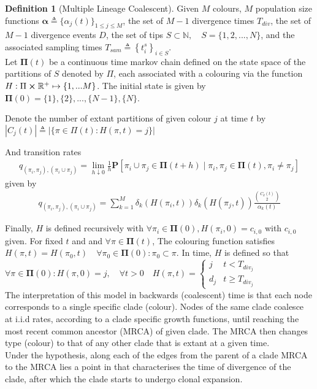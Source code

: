 \documentclass{report}
\newcommand{\R}{\mathbb{R}}
\newcommand{\N}{\mathbb{N}}
\theoremstyle{definition}
\newtheorem{definition}{Definition}[section]
\begin{document}
\begin{definition}[Multiple Lineage Coalescent]\label{def:model}
Given $M$ colours, $M$ population size functions $\mathbf{\alpha}\triangleq\{\alpha_j(t)\}_{1\leq j\leq M}$, the set of $M-1$ divergence times $T_{div}$, the set of $M-1$ divergence events $D$, the set of tips $S\subset \N, \quad S=\{1,2,...,N\}$, and the associated sampling times $T_{sam}\triangleq \left\{t^s_i\right\}_{i \in S}$.\\
Let $\pmb\Pi(t)$ be a continuous time markov chain defined on the state space of the partitions of $S$ denoted by $\Pi$, each associated with a colouring via the function $H: \Pi\cross\R^+ \mapsto \{1,...M\}$. The initial state is given by $\pmb\Pi(0) = \{1\}, \{2\}, ... , \{N-1\}, \{N\}$.

Denote the number of extant partitions of given colour $j$ at time $t$ by $|C_j(t)| \triangleq |\{\pi \in \Pi(t) : H(\pi, t) = j \}|$

And transition rates
\begin{gather}\label{eq:transitions}
q_{(\pi_i,\pi_j), (\pi_i\cup\pi_j)}=\lim\limits_{h \downarrow 0}\frac{1}{h}\mathbf{P}\left[\pi_i \cup \pi_j \in \pmb\Pi(t+h)\mid \pi_i, \pi_j \in \pmb\Pi(t), \pi_i \neq \pi_j \right]  
\end{gather}
given by
\begin{gather}\label{eq:rates}
q_{(\pi_i,\pi_j), (\pi_i\cup\pi_j)} = \sum\limits_{k=1}^{M} \delta_k(H(\pi_i,t))\delta_k(H(\pi_j,t))\frac{\binom{C_k(t)}{2}}{\alpha_k(t)}
\end{gather}
\end{definition}
Finally, $H$ is defined recursively with $\forall \pi_i \in \pmb\Pi(0), H(\pi_i,0) = c_{i,0}$ with $c_{i,0}$ given. For fixed $t$ and and $\forall \pi \in \pmb\Pi(t)$, The colouring function satisfies $H(\pi, t) = H(\pi_0,t)\quad \forall \pi_0 \in \pmb\Pi(0) : \pi_0 \subset \pi$. In time, $H$ is defined so that $\forall \pi \in \pmb\Pi(0) : H(\pi,0) = j,\quad \forall t>0 \quad H(\pi, t) = \begin{cases} 
      j & t < T_{div_j} \\
      d_j & t \geq T_{div_j}
   \end{cases}$\\
   
The interpretation of this model in backwards (coalescent) time is that each node corresponds to a single specific clade (colour). Nodes of the same clade coalesce at i.i.d rates, according to a clade specific growth functions, until reaching the most recent common ancestor (MRCA) of given clade. The MRCA then changes type (colour) to that of any other clade that is extant at a given time. \\
Under the hypothesis, along each of the edges from the parent of a clade MRCA to the MRCA lies a point in that characterises the time of divergence of the clade, after which the clade starts to undergo clonal expansion.
\end{document}
